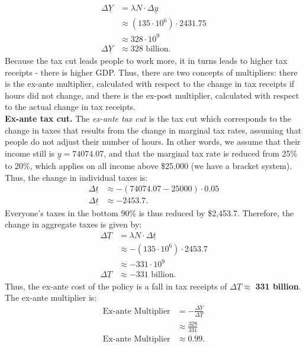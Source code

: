 \documentclass[]{book}
\begin{document}
\begin{enumerate}
\[\begin{aligned}
  \Delta \underline{Y} &= \lambda N \cdot \Delta \underline{y}\\
  & \approx (135 \cdot 10^6) \cdot 2431.75\\
  & \approx 328 \cdot 10^9 \\
  \Delta \underline{Y} & \approx  328 \text{ billion}.
  \end{aligned}
  \] Because the tax cut leads people to work more, it in turns leads to
  higher tax receipts - there is higher GDP. Thus, there are two
  concepts of multipliers: there is the ex-ante multiplier, calculated
  with respect to the change in tax receipts if hours did not change,
  and there is the ex-post multiplier, calculated with respect to the
  actual change in tax receipts.\\
  \textbf{Ex-ante tax cut.} The \emph{ex-ante tax cut} is the tax cut
  which corresponds to the change in taxes that results from the change
  in marginal tax rates, assuming that people do not adjust their number
  of hours. In other words, we assume that their income still is
  \(\underline{y}=74074.07\), and that the marginal tax rate is reduced
  from 25\% to 20\%, which applies on all income above \$25,000 (we have
  a bracket system). Thus, the change in individual taxes is: \[
  \begin{aligned}
  \Delta \underline{t} &\approx -(74074.07-25000) \cdot 0.05\\
  \Delta \underline{t} &\approx-2453.7.
  \end{aligned}
  \] Everyone's taxes in the bottom 90\% is thus reduced by \$2,453.7.
  Therefore, the change in aggregate taxes is given by: \[
  \begin{aligned}
  \Delta \underline{T} &= \lambda N \cdot \Delta \underline{t}\\
  & \approx - (135 \cdot 10^6) \cdot 2453.7\\
  & \approx -331 \cdot 10^9 \\
  \Delta \underline{T} & \approx  -331 \text{ billion}.
  \end{aligned}
  \] Thus, the ex-ante cost of the policy is a fall in tax receipts of
  \(\Delta \underline{T} \approx\) \textbf{331 billion}. The ex-ante
  multiplier is: \[
  \begin{aligned}
  \text{Ex-ante Multiplier} &= -\frac{\Delta \underline{Y}}{\Delta \underline{T}}\\
  &  \approx \frac{328}{331}\\
  \text{Ex-ante Multiplier} & \approx 0.99.
  \end{aligned}
\]
\end{enumerate}
\end{document}
